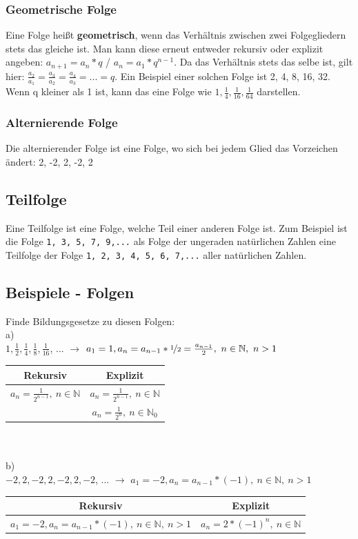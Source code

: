 \documentclass{article}
\newcommand{\N}{\mathbb{N}}
\begin{document}
	\subsubsection{Geometrische Folge}
	Eine Folge heißt \textbf{geometrisch}, wenn das Verhältnis zwischen zwei Folgegliedern stets das gleiche ist. Man kann diese erneut entweder rekursiv oder explizit angeben: $a_{n+1}=a_n*q$ / $a_n=a_1*q^{n-1}$. Da das Verhältnis stets das selbe ist, gilt hier: $\frac{a_2}{a_1}=\frac{a_3}{a_2}=\frac{a_4}{a_3}=...=q$. Ein Beispiel einer solchen Folge ist 2, 4, 8, 16, 32. Wenn q kleiner als 1 ist, kann das eine Folge wie $1, \frac{1}{4}, \frac{1}{16}, \frac{1}{64}$ darstellen.
	\subsubsection{Alternierende Folge}
	Die alternierender Folge ist eine Folge, wo sich bei jedem Glied das Vorzeichen ändert: 2, -2, 2, -2, 2
	\subsection{Teilfolge}
	Eine Teilfolge ist eine Folge, welche Teil einer anderen Folge ist. Zum Beispiel ist die Folge \verb|1, 3, 5, 7, 9,...| als Folge der ungeraden natürlichen Zahlen eine Teilfolge der Folge \verb|1, 2, 3, 4, 5, 6, 7,...| aller natürlichen Zahlen.
	\subsection{Beispiele - Folgen}
	Finde Bildungsgesetze zu diesen Folgen:\\
	a) \\
	$1, \frac{1}{2}, \frac{1}{4}, \frac{1}{8}, \frac{1}{16}$, ... $\to$ $a_1=1, a_n=a_{n-1}*\nicefrac{1}{2}=\frac{a_{n-1}}{2},\ n\in\N,\ n>1$ \\
	\begin{tabular}{| c | c |}
		\toprule
		Rekursiv & Explizit \\ \midrule
		$a_n=\frac{1}{2^{n-1}},\ n\in\N$ & $a_n=\frac{1}{2^{n-1}},\ n\in\N$ \\
		& $a_n=\frac{1}{2^n},\ n\in\N_0$ \\
		\bottomrule
	\end{tabular} \\ \\
	b) \\
	$-2, 2, -2, 2, -2, 2, -2$, ... $\to$ $a_1=-2, a_n=a_{n-1}*(-1),\ n\in\N,\ n>1$ \\
	\begin{tabular}{| c | c |}
		\toprule
		Rekursiv & Explizit \\ \midrule
		$a_1=-2, a_n=a_{n-1}*(-1),\ n\in\N,\ n>1$ & $a_n=2*(-1)^n,\ n\in\N$ \\
		\bottomrule
	\end{tabular}
\end{document}
